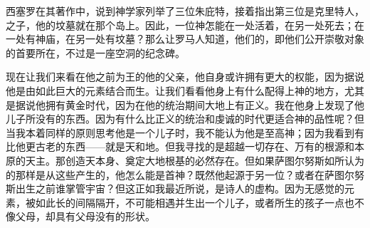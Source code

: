 \par

西塞罗在其著作中，说到神学家列举了三位朱庇特，接着指出第三位是克里特人，之子，他的坟墓就在那个岛上。因此，一位神怎能在一处活着，在另一处死去；在一处有神庙，在另一处有坟墓？那么让罗马人知道，他们的，即他们公开崇敬对象的首要所在，不过是一座空洞的纪念碑。\par

现在让我们来看在他之前为王的他的父亲，他自身或许拥有更大的权能，因为据说他是由如此巨大的元素结合而生。让我们看看他身上有什么配得上神的地方，尤其是据说他拥有黄金时代，因为在他的统治期间大地上有正义。我在他身上发现了他儿子所没有的东西。因为有什么比正义的统治和虔诚的时代更适合神的品性呢？但当我本着同样的原则思考他是一个儿子时，我不能认为他是至高神；因为我看到有比他更古老的东西——就是天和地。但我寻找的是超越一切存在、万有的根源和本原的天主。那创造天本身、奠定大地根基的必然存在。但如果萨图尔努斯如所认为的那样是从这些产生的，他怎么能是首神？既然他起源于另一位？或者在萨图尔努斯出生之前谁掌管宇宙？但这正如我最近所说，是诗人的虚构。因为无感觉的元素，被如此长的间隔隔开，不可能相遇并生出一个儿子，或者所生的孩子一点也不像父母，却具有父母没有的形状。\par

